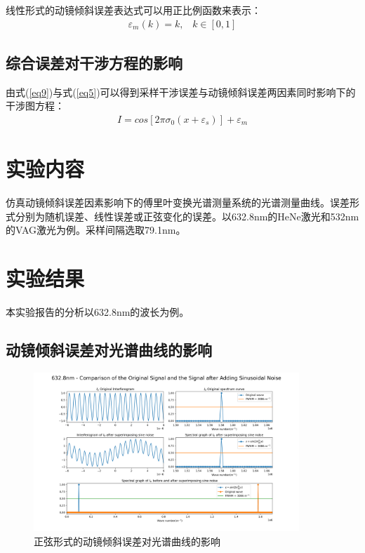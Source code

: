 \documentclass[conference]{IEEEtran}
\begin{document}
线性形式的动镜倾斜误差表达式可以用正比例函数来表示：
\begin{align}
    \varepsilon_m(k) = k, \;\;\; k \in [0, 1] \label{eq8}
\end{align}

\subsection{综合误差对干涉方程的影响}
由式(\ref{eq9})与式(\ref{eq5})可以得到采样干涉误差与动镜倾斜误差两因素同时影响下的干涉图方程：
\begin{align}
    I = cos\left[2\pi\sigma_0(x + \varepsilon_s)\right] + \varepsilon_m    \label{eq11}
\end{align}

\section{实验内容}
仿真动镜倾斜误差因素影响下的傅里叶变换光谱测量系统的光谱测量曲线。误差形式分别为随机误差、线性误差或正弦变化的误差。以632.8nm的HeNe激光和532nm的VAG激光为例。采样间隔选取79.1nm。

\section{实验结果}
本实验报告的分析以632.8nm的波长为例。

\subsection{动镜倾斜误差对光谱曲线的影响}

\begin{figure}[htbp]
	\centerline{
		\includegraphics[width=10cm]{1.png} 	
	}
	\caption{正弦形式的动镜倾斜误差对光谱曲线的影响}
	\label{pic1}
\end{figure}
\end{document}
